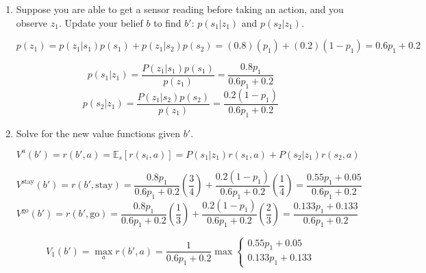\documentclass[12pt]{article}
\begin{document}
\begin{enumerate}
\item Suppose you are able to get a sensor reading before taking an
  action, and you observe $z_1$.  Update your belief $b$ to find $b'$:
  $p(s_1 | z_1)$ and $p(s_2 | z_1)$.

  \[
    p(z_1) = p(z_1|s_1)p(s_1) + p(z_1|s_2)p(s_2) = (0.8)(p_1) + (0.2)(1-p_1) = 0.6p_1 + 0.2
  \]

  \[
    p(s_1|z_1) = \frac{P(z_1|s_1)p(s_1)}{p(z_1)} = \frac{0.8p_1}{0.6p_1 + 0.2}
  \]
  \[
    p(s_2|z_1) = \frac{P(z_1|s_2)p(s_2)}{p(z_1)} = \frac{0.2(1-p_1)}{0.6p_1 + 0.2}
  \]

\item Solve for the new value functions given $b'$.

\[
  V^a(b') = r(b', a) = \mathbb{E}_s[r(s_i,a)] = P(s_1|z_1)r(s_1,a) + P(s_2|z_1)r(s_2,a)
\]

\[
  V^{\text{stay}}(b') = r(b', \text{stay}) = \frac{0.8p_1}{0.6p_1 + 0.2} (\frac{3}{4}) + \frac{0.2(1-p_1)}{0.6p_1 + 0.2} (\frac{1}{4}) = \frac{0.55p_1 + 0.05}{0.6p_1 + 0.2}
\]
\[
  V^{\text{go}}(b') = r(b', \text{go}) = \frac{0.8p_1}{0.6p_1 + 0.2} (\frac{1}{3}) + \frac{0.2(1-p_1)}{0.6p_1 + 0.2} (\frac{2}{3}) = \frac{0.133p_1 + 0.133}{0.6p_1 + 0.2}
\]

\[
  V_1(b') = \max_a{r(b', a)} = \frac{1}{0.6p_1 + 0.2} \max{
    \begin{cases}
      0.55p_1 + 0.05 \\
      0.133p_1 + 0.133
    \end{cases}
  }
\]

\end{enumerate}
\end{document}
